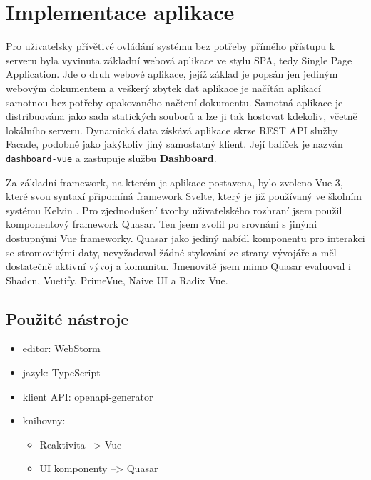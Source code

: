 \section{Implementace aplikace}
Pro uživatelsky přívětivé ovládání systému bez potřeby přímého přístupu k serveru byla vyvinuta základní webová aplikace ve stylu SPA, tedy Single Page Application. Jde o druh webové aplikace, jejíž základ je popsán jen jediným webovým dokumentem a veškerý zbytek dat aplikace je načítán aplikací samotnou bez potřeby opakovaného načtení dokumentu\cite{SPASinglepageApplication2023}. Samotná aplikace je distribuována jako sada statických souborů a lze ji tak hostovat kdekoliv, včetně lokálního serveru. Dynamická data získává aplikace skrze REST API služby Facade, podobně jako jakýkoliv jiný samostatný klient. Její balíček je nazván \lstinline|dashboard-vue| a zastupuje službu \textbf{Dashboard}.

Za základní framework, na kterém je aplikace postavena, bylo zvoleno Vue 3, které svou syntaxí připomíná framework Svelte, který je již používaný ve školním systému Kelvin \cite{SPASinglepageApplication2023}. Pro zjednodušení tvorby uživatelského rozhraní jsem použil komponentový framework Quasar\cite{QuasarframeworkQuasar2024}. Ten jsem zvolil po srovnání s jinými dostupnými Vue frameworky. Quasar jako jediný nabídl komponentu pro interakci se stromovitými daty, nevyžadoval žádné stylování ze strany vývojáře a měl dostatečně aktivní vývoj a komunitu. Jmenovitě jsem mimo Quasar evaluoval i Shadcn\cite{RadixvueRadixvue2024}, Vuetify\cite{VuetifyjsVuetify2024}, PrimeVue\cite{PrimefacesPrimevueNext}, Naive UI\cite{TusenaiNaiveui2024} a Radix Vue\cite{RadixvueShadcnvue2024}.

\subsection{Použité nástroje}
\begin{itemize}
    \item editor: WebStorm
    \item jazyk: TypeScript
    \item klient API: openapi-generator\cite{OpenAPIToolsOpenapigeneratorOpenAPI}
    \item knihovny:
        \begin{itemize}
            \item Reaktivita --> Vue\cite{VuejsCore2024}
            \item UI komponenty --> Quasar\cite{QuasarframeworkQuasar2024}
        \end{itemize}
\end{itemize}

